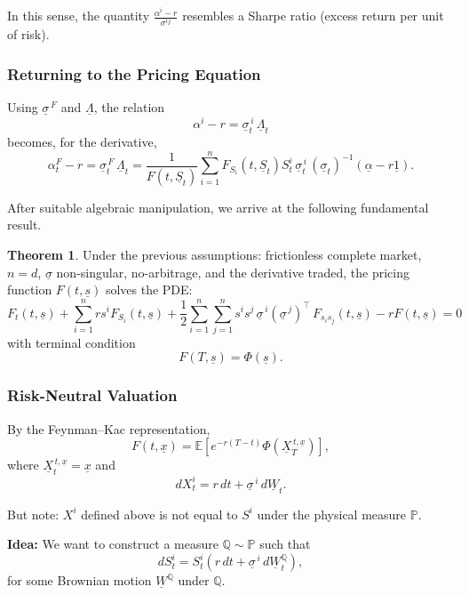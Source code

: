 \documentclass[12pt,a4paper]{article}
\theoremstyle{definition}
\newtheorem{theorem}{Theorem}[section]
\begin{document}
In this sense, the quantity $\frac{\alpha^i - r}{\sigma^{ij}}$ resembles a Sharpe ratio (excess return per unit of risk).

\subsubsection{Returning to the Pricing Equation}

Using $\underline{\sigma}^{\,F}$ and $\underline{\Lambda}$, the relation
\[
\alpha^i - r = \underline{\sigma}_t^{\,i} \, \underline{\Lambda}_t
\]
becomes, for the derivative,
\[
\alpha_t^F - r = \underline{\sigma}_t^{\,F} \, \underline{\Lambda}_t = \frac{1}{F(t, \underline{S}_t)} \sum_{i=1}^n F_{S_i}(t, \underline{S}_t) S_t^i \, \underline{\sigma}_t^{\,i} \, (\underline{\sigma}_t)^{-1} (\underline{\alpha} - r\underline{1}).
\]

After suitable algebraic manipulation, we arrive at the following fundamental result.

\begin{theorem}
Under the previous assumptions: frictionless complete market, $n = d$, $\underline{\sigma}$ non-singular, no-arbitrage, and the derivative traded, the pricing function $F(t, \underline{s})$ solves the PDE:
\[
F_t(t, \underline{s}) + \sum_{i=1}^n r s^i F_{S_i}(t, \underline{s}) + \frac{1}{2} \sum_{i=1}^n \sum_{j=1}^n s^i s^j \, \underline{\sigma}^{\,i} (\underline{\sigma}^{\,j})^\top \, F_{s_i s_j}(t, \underline{s}) - r F(t, \underline{s}) = 0
\]
with terminal condition
\[
F(T, \underline{s}) = \Phi(\underline{s}).
\]
\end{theorem}

\subsubsection{Risk-Neutral Valuation}

By the Feynman--Kac representation,
\[
F(t, \underline{x}) = \mathbb{E}\left[e^{-r(T-t)} \Phi(\underline{X}_T^{\,t,\underline{x}})\right],
\]
where $\underline{X}_t^{\,t,\underline{x}} = \underline{x}$ and
\[
dX_t^i = r \, dt + \underline{\sigma}^{\,i} \, d\underline{W}_t.
\]

But note: $X^i$ defined above is not equal to $S^i$ under the physical measure $\mathbb{P}$.

\textbf{Idea:} We want to construct a measure $\mathbb{Q} \sim \mathbb{P}$ such that
\[
dS_t^i = S_t^i(r \, dt + \underline{\sigma}^{\,i} \, d\underline{W}_t^\mathbb{Q}),
\]
for some Brownian motion $\underline{W}^\mathbb{Q}$ under $\mathbb{Q}$.
\end{document}

